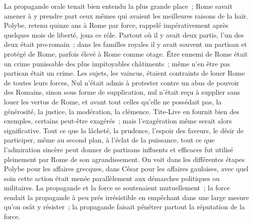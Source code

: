 \documentclass[french,twoside]{book} %
\begin{document}
La propagande orale tenait bien entendu la plus grande place ; Rome savait amener à y prendre part ceux mêmes qui avaient les meilleures raisons de la haïr. Polybe, retenu quinze ans à Rome par force, rappelé impérative­ment après quelques mois de liberté, joua ce rôle. Partout où il y avait deux partis, l'un des deux était pro-romain ; dans les familles royales il y avait souvent un partisan et protégé de Rome, parfois élevé à Rome comme otage. Être ennemi de Rome était un crime punissable des plus impitoyables châti­ments ; même n'en être pas partisan était un crime. Les sujets, les vaincus, étaient contraints de louer Rome de toutes leurs forces, Nul n'était admis à protester contre un abus de pouvoir des Romains, sinon sous forme de supplication, nul n'était reçu à supplier sans louer les vertus de Rome, et avant tout celles qu'elle ne possédait pas, la générosité, la justice, la modération, la clémence. Tite-Live en fournit bien des exemples, certains peut-être exagérés ; mais l'exagération même serait alors significative. Tout ce que la lâcheté, la prudence, l'espoir des faveurs, le désir de participer, même au second plan, à l'éclat de la puissance, tout ce que l'admiration sincère peut donner de parti­sans influents et efficaces fut utilisé pleinement par Rome de son agrandisse­ment. On voit dans les différentes étapes Polybe pour les affaires grecques, dans César pour les affaires gauloises, avec quel soin cette action était menée parallèlement aux démarches politiques ou militaires. La propagande et la force se soutenaient mutuellement ; la force rendait la propagande à peu prés irrésistible en empêchant dans une large mesure qu'on osât y résister ; la propagande faisait pénétrer partout la réputation de la force.\par
\end{document}
